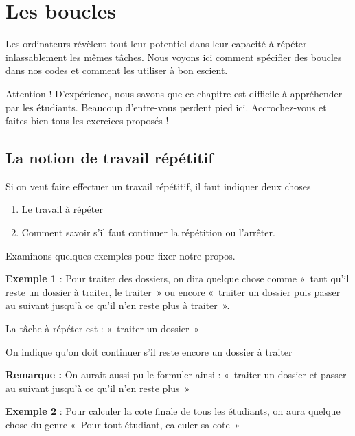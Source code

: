 \chapter{Les boucles}
\label{chap:bcl}

	Les ordinateurs révèlent tout leur potentiel dans leur capacité à
	répéter inlassablement les mêmes tâches. Nous voyons ici comment
	spécifier des boucles dans nos codes et comment les utiliser à bon
	escient.

	Attention ! D'expérience, nous savons que ce chapitre
	est difficile à appréhender par les étudiants. Beaucoup
	d'entre-vous perdent pied ici. Accrochez-vous et
	faites bien tous les exercices proposés !


\section{La notion de travail répétitif}

	Si on veut faire effectuer un travail répétitif, 
	il faut indiquer deux choses
	
	\begin{enumerate}
	\item Le travail à répéter
	\item Comment savoir s'il faut continuer la répétition 
		ou l'arrêter.
	\end{enumerate}

	Examinons quelques exemples pour fixer notre propos.

	\textbf{Exemple 1} : Pour traiter des dossiers, on dira quelque chose
	comme «~tant qu'il reste un dossier à traiter, le
	traiter~» ou encore «~traiter un dossier puis passer au suivant
	jusqu'à ce qu'il
	n'en reste plus à traiter~».

	\begin{liste}
	\item La tâche à répéter est : «~traiter un dossier~»
	\item On indique qu'on doit continuer s'il
		reste encore un dossier à traiter
	\end{liste}

	\textbf{Remarque :} On aurait aussi pu le formuler ainsi : «~traiter un
	dossier et passer au suivant jusqu'à ce
	qu'il n'en reste plus~»

	\textbf{Exemple 2} : Pour calculer la cote finale de tous les étudiants,
	on aura quelque chose du genre «~Pour tout étudiant, calculer sa
	cote~»

